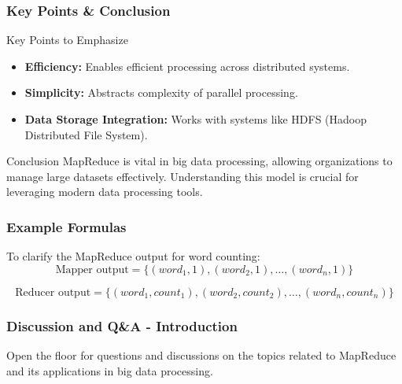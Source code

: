 \documentclass[aspectratio=169]{beamer}
\begin{document}
\begin{frame}[fragile]
    \frametitle{Key Points & Conclusion}
    \begin{block}{Key Points to Emphasize}
        \begin{itemize}
            \item \textbf{Efficiency:} Enables efficient processing across distributed systems.
            \item \textbf{Simplicity:} Abstracts complexity of parallel processing.
            \item \textbf{Data Storage Integration:} Works with systems like HDFS (Hadoop Distributed File System).
        \end{itemize}
    \end{block}
    
    \begin{block}{Conclusion}
        MapReduce is vital in big data processing, allowing organizations to manage large datasets effectively. Understanding this model is crucial for leveraging modern data processing tools.
    \end{block}
\end{frame}

\begin{frame}[fragile]
    \frametitle{Example Formulas}
    To clarify the MapReduce output for word counting:
    \begin{equation}
        \text{Mapper output} = \{(word_1, 1), (word_2, 1), \ldots, (word_n, 1)\}
    \end{equation}
    
    \begin{equation}
        \text{Reducer output} = \{(word_1, count_1), (word_2, count_2), \ldots, (word_n, count_n)\}
    \end{equation}
\end{frame}

\begin{frame}[fragile]
    \frametitle{Discussion and Q\&A - Introduction}
    Open the floor for questions and discussions on the topics related to MapReduce and its applications in big data processing.
\end{frame}
\end{document}

